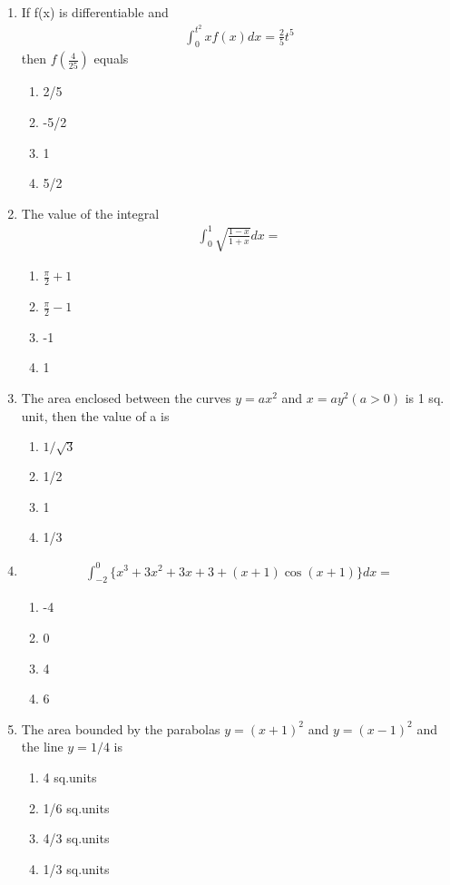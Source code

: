 \begin{enumerate}[label=\arabic*.,ref=\thesubsection.\theenumi]
\item If f(x) is differentiable and 
\begin{align*}
\int_{0}^{t^{2}}xf(x)dx = \frac{2}{5}t^{5}
\end{align*}
then $f(\frac{4}{25})$ equals
\begin{enumerate}
\item 2/5
\item -5/2
\item 1
\item 5/2
\end{enumerate}

\item The value of the integral
\begin{align*}
\int_{0}^{1}\sqrt{\frac{1 - x}{1 + x}}dx = 
\end{align*}
\begin{enumerate}
\item $\frac{\pi}{2} + 1$
\item $\frac{\pi}{2} - 1$
\item -1
\item 1
\end{enumerate}

\item The area enclosed between the curves $y = ax^{2}$  and $x = ay^{2}(a > 0)$ is 1 sq. unit, then the value of a is
\begin{enumerate}
\item $1/\sqrt{3}$
\item 1/2
\item 1
\item 1/3
\end{enumerate}

\item 
\begin{align*}
\int_{-2}^{0}\{x^3+3x^2+3x+3+(x+1)\cos(x+1)\}dx = 
\end{align*}
\begin{enumerate}
\item -4
\item 0
\item 4
\item 6
\end{enumerate}

\item The area bounded by the parabolas $y = (x + 1)^{2}$ and $y = (x - 1)^{2}$ and the line $y = 1/4$ is
\begin{enumerate}
\item 4 sq.units
\item 1/6 sq.units
\item 4/3 sq.units
\item 1/3 sq.units
\end{enumerate}


\end{enumerate}
